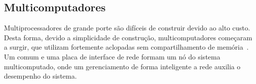 %
%
%
%
%
%
%
%
%
\subsection{Multicomputadores}

%
%
%
%
Multiprocessadores de grande porte são difíceis de construir devido ao alto
custo. Desta forma, devido a simplicidade de construção, multicomputadores
começaram a surgir, que utilizam \cpus fortemente aclopadas sem compartilhamento
de memória~\cite{Tanenbaum2015}. Um \pc comum e uma placa de interface de rede formam um nó do
sistema multicomputado, onde um gerenciamento de forma inteligente a rede auxilia o desempenho
do sistema.

